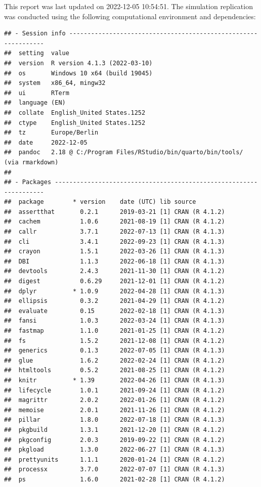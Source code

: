 \documentclass[10,a4paperpaper,]{article}
\begin{document}
This report was last updated on 2022-12-05 10:54:51. The simulation
replication was conducted using the following computational environment
and dependencies:

\FloatBarrier

\begin{verbatim}
## - Session info ---------------------------------------------------------------
##  setting  value
##  version  R version 4.1.3 (2022-03-10)
##  os       Windows 10 x64 (build 19045)
##  system   x86_64, mingw32
##  ui       RTerm
##  language (EN)
##  collate  English_United States.1252
##  ctype    English_United States.1252
##  tz       Europe/Berlin
##  date     2022-12-05
##  pandoc   2.18 @ C:/Program Files/RStudio/bin/quarto/bin/tools/ (via rmarkdown)
## 
## - Packages -------------------------------------------------------------------
##  package        * version    date (UTC) lib source
##  assertthat       0.2.1      2019-03-21 [1] CRAN (R 4.1.2)
##  cachem           1.0.6      2021-08-19 [1] CRAN (R 4.1.2)
##  callr            3.7.1      2022-07-13 [1] CRAN (R 4.1.3)
##  cli              3.4.1      2022-09-23 [1] CRAN (R 4.1.3)
##  crayon           1.5.1      2022-03-26 [1] CRAN (R 4.1.3)
##  DBI              1.1.3      2022-06-18 [1] CRAN (R 4.1.3)
##  devtools         2.4.3      2021-11-30 [1] CRAN (R 4.1.2)
##  digest           0.6.29     2021-12-01 [1] CRAN (R 4.1.2)
##  dplyr          * 1.0.9      2022-04-28 [1] CRAN (R 4.1.3)
##  ellipsis         0.3.2      2021-04-29 [1] CRAN (R 4.1.2)
##  evaluate         0.15       2022-02-18 [1] CRAN (R 4.1.3)
##  fansi            1.0.3      2022-03-24 [1] CRAN (R 4.1.3)
##  fastmap          1.1.0      2021-01-25 [1] CRAN (R 4.1.2)
##  fs               1.5.2      2021-12-08 [1] CRAN (R 4.1.2)
##  generics         0.1.3      2022-07-05 [1] CRAN (R 4.1.3)
##  glue             1.6.2      2022-02-24 [1] CRAN (R 4.1.2)
##  htmltools        0.5.2      2021-08-25 [1] CRAN (R 4.1.2)
##  knitr          * 1.39       2022-04-26 [1] CRAN (R 4.1.3)
##  lifecycle        1.0.1      2021-09-24 [1] CRAN (R 4.1.2)
##  magrittr         2.0.2      2022-01-26 [1] CRAN (R 4.1.2)
##  memoise          2.0.1      2021-11-26 [1] CRAN (R 4.1.2)
##  pillar           1.8.0      2022-07-18 [1] CRAN (R 4.1.3)
##  pkgbuild         1.3.1      2021-12-20 [1] CRAN (R 4.1.2)
##  pkgconfig        2.0.3      2019-09-22 [1] CRAN (R 4.1.2)
##  pkgload          1.3.0      2022-06-27 [1] CRAN (R 4.1.3)
##  prettyunits      1.1.1      2020-01-24 [1] CRAN (R 4.1.2)
##  processx         3.7.0      2022-07-07 [1] CRAN (R 4.1.3)
##  ps               1.6.0      2021-02-28 [1] CRAN (R 4.1.2)

\end{verbatim}
\end{document}
